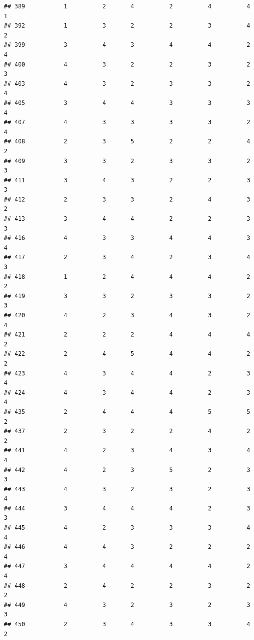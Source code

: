 \documentclass[
]{article}
\begin{document}
\begin{verbatim}
## 389           1          2       4          2          4          4        1
## 392           1          3       2          2          3          4        2
## 399           3          4       3          4          4          2        4
## 400           4          3       2          2          3          2        3
## 403           4          3       2          3          3          2        4
## 405           3          4       4          3          3          3        4
## 407           4          3       3          3          3          2        4
## 408           2          3       5          2          2          4        2
## 409           3          3       2          3          3          2        3
## 411           3          4       3          2          2          3        3
## 412           2          3       3          2          4          3        2
## 413           3          4       4          2          2          3        3
## 416           4          3       3          4          4          3        4
## 417           2          3       4          2          3          4        3
## 418           1          2       4          4          4          2        2
## 419           3          3       2          3          3          2        3
## 420           4          2       3          4          3          2        4
## 421           2          2       2          4          4          4        2
## 422           2          4       5          4          4          2        2
## 423           4          3       4          4          2          3        4
## 424           4          3       4          4          2          3        4
## 435           2          4       4          4          5          5        2
## 437           2          3       2          2          4          2        2
## 441           4          2       3          4          3          4        4
## 442           4          2       3          5          2          3        3
## 443           4          3       2          3          2          3        4
## 444           3          4       4          4          2          3        3
## 445           4          2       3          3          3          4        4
## 446           4          4       3          2          2          2        4
## 447           3          4       4          4          4          2        4
## 448           2          4       2          2          3          2        2
## 449           4          3       2          3          2          3        3
## 450           2          3       4          3          3          4        2

\end{verbatim}
\end{document}
